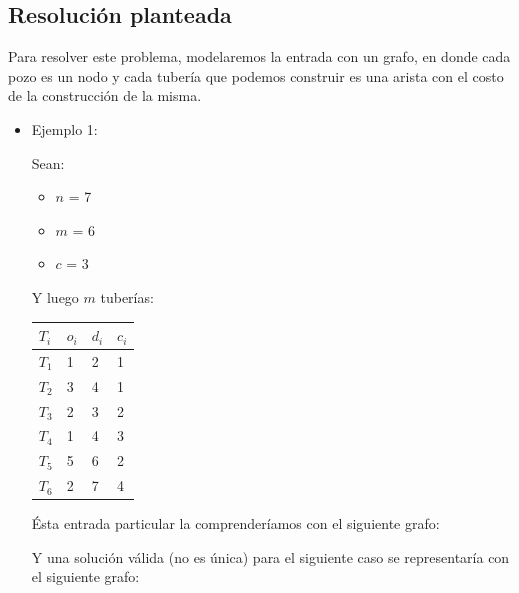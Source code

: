 \subsection{Resolución planteada}
Para resolver este problema, modelaremos la entrada con un grafo, en donde cada pozo es un nodo y cada tubería que podemos construir es una arista con el costo de la construcción de la misma. \\

\begin{itemize}
\item Ejemplo 1:

Sean:
\begin{itemize}
      \item $n$ = 7
      \item $m$ = 6
      \item $c$ = 3
\end{itemize}

Y luego $m$ tuberías:

\begin{table}[H]
\centering
\parbox{0.3\textwidth}{
    \begin{tabular}{ | l | l | l | l |}
    \hline
$T_{i}$ & $o_{i}$ & $d_{i}$ & $c_{i}$ \\ \hline
$T_{1}$ & 1 & 2 & 1 \\ \hline
$T_{2}$ & 3 & 4 & 1 \\ \hline
$T_{3}$ & 2 & 3 & 2 \\ \hline
$T_{4}$ & 1 & 4 & 3 \\ \hline
$T_{5}$ & 5 & 6 & 2 \\ \hline
$T_{6}$ & 2 & 7 & 4 \\ \hline
    \end{tabular}
}
\end{table}

Ésta entrada particular la comprenderíamos con el siguiente grafo:


Y una solución válida (no es única) para el siguiente caso se representaría con el siguiente grafo:


\end{itemize}
